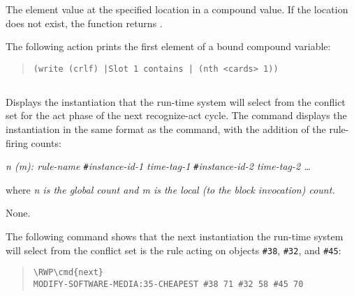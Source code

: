\ReturnValue

The element value at the specified location in a compound
value. If the location does not exist, the function returns
.

\Example

The following action prints the first element of a bound compound
variable:

\begin{quote}
\begin{verbatim}
(write (crlf) |Slot 1 contains | (nth <cards> 1))
\end{verbatim}
\end{quote}

\subsection{}

Displays the instantiation that the run-time system will select from
the conflict set for the act phase of the next recognize-act
cycle. The  command displays the instantiation in the same
format as the  command, with the addition of the rule-firing
counts:

\it{n} (\it{m}): \it{rule-name} \verb|#|\it{instance-id-1}
\it{time-tag-1} \verb|#|\it{instance-id-2} \it{time-tag-2} \ldots

where \it{n} is the global count and \it{m} is the local (to the block
invocation) count.

\Format


\Arguments

None.

\Example

The following command shows that the next instantiation the run-time
system will select from the conflict set is the rule
 acting on objects \verb|#38|,
\verb|#32|, and \verb|#45|:

\begin{quote}
\begin{Verbatim}[commandchars=\\\{\}]
\RWP\cmd{next}
MODIFY-SOFTWARE-MEDIA:35-CHEAPEST #38 71 #32 58 #45 70
\end{Verbatim}
\end{quote}

\subsection{}

